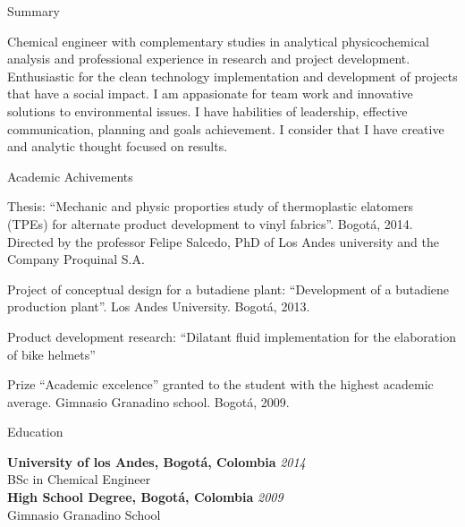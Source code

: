 \documentclass[spanish]{resume}
\begin{document}

\begin{rSection}{Summary}

Chemical engineer with complementary studies in analytical physicochemical analysis and professional experience in research and project development. Enthusiastic for the clean technology implementation and development of projects that have a social impact. I am appasionate for team work and innovative solutions to environmental issues. I have habilities of leadership, effective communication, planning and goals achievement. I consider that I have creative and analytic thought focused on results.

\end{rSection}


\begin{rSection}{Academic Achivements}

Thesis: “Mechanic and physic proporties study of thermoplastic elatomers (TPEs) for alternate product development to vinyl fabrics”. Bogot\'a, 2014. Directed by the professor Felipe Salcedo, PhD of Los Andes university and the Company Proquinal S.A.

Project of conceptual design for a butadiene plant: “Development of a butadiene production plant”. Los Andes University. Bogot\'a, 2013.

Product development research: “Dilatant fluid implementation for the elaboration of bike helmets”

Prize “Academic excelence” granted to the student with the highest academic average. Gimnasio Granadino school. Bogot\'a, 2009.

\end{rSection}


\begin{rSection}{Education}

{\bf University of los Andes, Bogot\'a, Colombia} \hfill {\em 2014} \\
BSc in Chemical Engineer \\

{\bf High School Degree, Bogot\'a, Colombia} \hfill {\em 2009} \\
Gimnasio Granadino School

\end{rSection}
\end{document}

